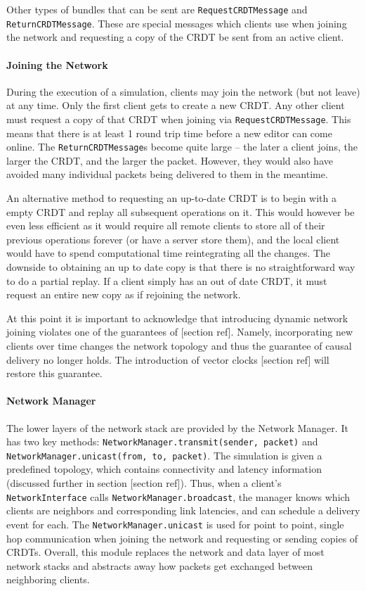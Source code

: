 \documentclass[12pt,a4paper,twoside,openright]{report}
\begin{document}
		Other types of bundles that can be sent are \lstinline|RequestCRDTMessage| and \lstinline|ReturnCRDTMessage|. These are special messages which clients use when joining the network and requesting a copy of the CRDT be sent from an active client.
		
		\paragraph{Joining the Network}
		During the execution of a simulation, clients may join the network (but not leave) at any time. Only the first client gets to create a new CRDT. Any other client must request a copy of that CRDT when joining via \lstinline|RequestCRDTMessage|. This means that there is at least 1 round trip time before a new editor can come online. The \lstinline|ReturnCRDTMessage|s become quite large -- the later a client joins, the larger the CRDT, and the larger the packet. However, they would also have avoided many individual packets being delivered to them in the meantime.
		
		An alternative method to requesting an up-to-date CRDT is to begin with a empty CRDT and replay all subsequent operations on it. This would however be even less efficient as it would require all remote clients to store all of their previous operations forever (or have a server store them), and the local client would have to spend computational time reintegrating all the changes. The downside to obtaining an up to date copy is that there is no straightforward way to do a partial replay. If a client simply has an out of date CRDT, it must request an entire new copy as if rejoining the network.
		
		At this point it is important to acknowledge that introducing dynamic network joining violates one of the guarantees of [section ref]. Namely, incorporating new clients over time changes the network topology and thus the guarantee of causal delivery no longer holds. The introduction of vector clocks [section ref] will restore this guarantee.
		
		\paragraph{Network Manager}
		The lower layers of the network stack are provided by the Network Manager. It has two key methods: \lstinline|NetworkManager.transmit(sender, packet)| and \lstinline|NetworkManager.unicast(from, to, packet)|. The simulation is given a predefined topology, which contains connectivity and latency information (discussed further in section [section ref]). Thus, when a client's \lstinline|NetworkInterface| calls \lstinline|NetworkManager.broadcast|, the manager knows which clients are neighbors and corresponding link latencies, and can schedule a delivery event for each. The \lstinline|NetworkManager.unicast| is used for point to point, single hop communication when joining the network and requesting or sending copies of CRDTs. Overall, this module replaces the network and data layer of most network stacks and abstracts away how packets get exchanged between neighboring clients.
		
\end{document}
